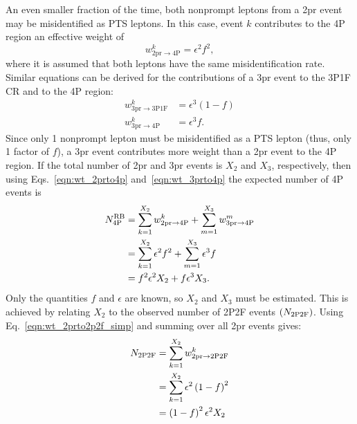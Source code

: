 An even smaller fraction of the time, both nonprompt leptons from a 2pr event may be misidentified as PTS leptons.
In this case, event $k$ contributes to the 4P region an effective weight of
\begin{equation}
	\label{eqn:wt_2prto4p}
	w^{k}_{\mathrm{2pr \to 4P}} = \epsilon^2 f^2,
\end{equation}
where it is assumed that both leptons have the same misidentification rate.
Similar equations can be derived for the contributions of a 3pr event to the 3P1F CR and to the 4P region:
\begin{align}
	\label{eqn:wt_3prto3p1f}
	w^{k}_{\mathrm{3pr \to 3P1F}} &= \epsilon^3 \left( 1-f \right)
	\\
	\label{eqn:wt_3prto4p}
	w^{k}_{\mathrm{3pr \to 4P}} &= \epsilon^3 f.
\end{align}
Since only 1 nonprompt lepton must be misidentified as a PTS lepton (thus, only 1 factor of $f$), a 3pr event contributes more weight than a 2pr event to the 4P region.
If the total number of 2pr and 3pr events is $X_2$ and $X_3$, respectively, then using Eqs.~\ref{eqn:wt_2prto4p} and~\ref{eqn:wt_3prto4p} the expected number of 4P events is
\begin{align}
	\label{eqn:n4p_x2x3}
	N_{\mathrm{4P}}^{\mathrm{RB}}
	&= \sum_{k=1}^{X_{2}} w^{k}_{\mathrm{2pr \to 4P}} + \sum_{m=1}^{X_{3}} w^{m}_{\mathrm{3pr \to 4P}}
	\notag
	\\
	&= \sum_{k=1}^{X_{2}} \epsilon^2 f^2 + \sum_{m=1}^{X_{3}} \epsilon^3 f
	\notag
	\\
	&= f^2 \epsilon^2 X_{2} + f \epsilon^3 X_{3}.
\end{align}
Only the quantities $f$ and $\epsilon$ are known, so $X_2$ and $X_3$ must be estimated.
This is achieved by relating $X_2$ to the observed number of 2P2F events $\left( N_{\mathrm{2P2F}} \right)$.
Using Eq.~\ref{eqn:wt_2prto2p2f_simp} and summing over all 2pr events gives:
\begin{align}
	\label{eqn:n2p2f_x2}
	N_{\mathrm{2P2F}}
	&= \sum_{k=1}^{X_{2}} w^{k}_{\mathrm{2pr \to 2P2F}}
	\notag
	\\
	&= \sum_{k=1}^{X_{2}} \epsilon^2 \left( 1-f \right)^2
	\notag
	\\
	&= \left( 1-f \right)^2 \epsilon^2 X_{2}
\end{align}

